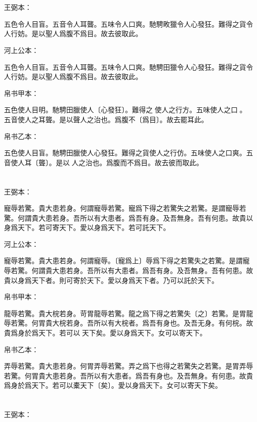 \documentclass[a5paper]{ctexbook}
\begin{document}
    \chapter{}
    王弼本：

    五色令人目盲。五音令人耳聾。五味令人口爽。馳騁畋獵令人心發狂。難得之貨令人行妨。是以聖人爲腹不爲目。故去彼取此。

    河上公本：

    五色令人目盲。五音令人耳聾。五味令人口爽。馳騁田獵令人心發狂。難得之貨令人行妨。是以聖人爲腹不爲目。故去彼取此。

    帛书甲本：

    五色使人目明。馳騁田臘使人〔心發狂〕。難得之𧷴使人之行方。五味使人之口𠷹。五音使人之耳聾。是以聲人之治也。爲腹不〔爲目〕。故去罷耳此。

    帛书乙本：

    五色使人目盲。馳騁田臘使人心發狂。難得之貨使人之行仿。五味使人之口爽。五音使人耳〔聾〕。是以𦔻人之治也。爲腹而不爲目。故去彼而取此。

    \chapter{}
    王弼本：

    寵辱若驚。貴大患若身。何謂寵辱若驚。寵爲下得之若驚失之若驚。是謂寵辱若驚。何謂貴大患若身。吾所以有大患者。爲吾有身。及吾無身。吾有何患。故貴以身爲天下。若可寄天下。愛以身爲天下。若可託天下。

    河上公本：

    寵辱若驚。貴大患若身。何謂寵辱。〔寵爲上〕辱爲下得之若驚失之若驚。是謂寵辱若驚。何謂貴大患若身。吾所以有大患者。爲吾有身。及吾無身。吾有何患。故貴以身爲天下者。則可寄於天下。愛以身爲天下者。乃可以託於天下。

    帛书甲本：

    龍辱若驚。貴大梡若身。苛胃龍辱若驚。龍之爲下得之若驚失〔之〕若驚。是胃龍辱若驚。何胃貴大梡若身。吾所以有大梡者。爲吾有身也。及吾无身。有何梡。故貴爲身於爲天下。若可以𨒙天下矣。愛以身爲天下。女可以寄天下。

    帛书乙本：

    弄辱若驚。貴大患若身。何胃弄辱若驚。弄之爲下也得之若驚失之若驚。是胃弄辱若驚。何胃貴大患若身。吾所以有大患者。爲吾有身也。及吾無身。有何患。故貴爲身於爲天下。若可以橐天下〔矣〕。愛以身爲天下。女可以寄天下矣。

    \chapter{}
    王弼本：
\end{document}
